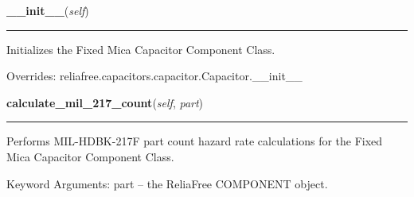 \hspace{.8\funcindent}\begin{boxedminipage}{\funcwidth}

    \raggedright \textbf{\_\_init\_\_}(\textit{self})

    \vspace{-1.5ex}

    \rule{\textwidth}{0.5\fboxrule}
\setlength{\parskip}{2ex}
    Initializes the Fixed Mica Capacitor Component Class.

\setlength{\parskip}{1ex}
      Overrides: reliafree.capacitors.capacitor.Capacitor.\_\_init\_\_

    \end{boxedminipage}

    \label{reliafree:capacitors:fixed:Mica:calculate_mil_217_count}

    \vspace{0.5ex}

\hspace{.8\funcindent}\begin{boxedminipage}{\funcwidth}

    \raggedright \textbf{calculate\_mil\_217\_count}(\textit{self}, \textit{part})

    \vspace{-1.5ex}

    \rule{\textwidth}{0.5\fboxrule}
\setlength{\parskip}{2ex}
    Performs MIL-HDBK-217F part count hazard rate calculations for the 
    Fixed Mica Capacitor Component Class.

    Keyword Arguments: part -- the ReliaFree COMPONENT object.

\setlength{\parskip}{1ex}
    \end{boxedminipage}

    \label{reliafree:capacitors:fixed:Mica:calculate_mil_217_stress}

    \vspace{0.5ex}

